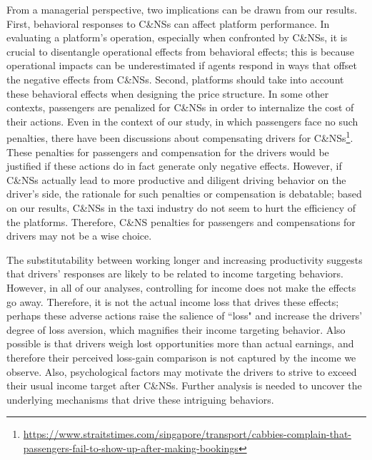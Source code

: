 \documentclass[reviewmode]{AEA}
\begin{document}
From a managerial perspective, two implications can be drawn from our results. First, behavioral responses to C\&NSs can affect platform performance. In evaluating a platform's operation, especially when confronted by C\&NSs, it is crucial to disentangle operational effects from behavioral effects; this is because operational impacts can be underestimated if agents respond in ways that offset the negative effects from C\&NSs. Second, platforms should take into account these behavioral effects when designing the price structure. In some other contexts, passengers are penalized for C\&NSs in order to internalize the cost of their actions. Even in the context of our study, in which passengers face no such penalties, there have been discussions about compensating drivers for C\&NSs\footnote{\url{https://www.straitstimes.com/singapore/transport/cabbies-complain-that-passengers-fail-to-show-up-after-making-bookings}}. These penalties for passengers and compensation for the drivers would be justified if these actions do in fact generate only negative effects. However, if C\&NSs actually lead to more productive and diligent driving behavior on the driver's side, the rationale for such penalties or compensation is debatable; based on our results, C\&NSs in the taxi industry do not seem to hurt the efficiency of the platforms. Therefore, C\&NS penalties for passengers and compensations for drivers may not be a wise choice.

The substitutability between working longer and increasing productivity suggests that drivers' responses are likely to be related to income targeting behaviors. However, in all of our analyses, controlling for income does not make the effects go away. Therefore, it is not the actual income loss that drives these effects; perhaps these adverse actions raise the salience of ``loss" and increase the drivers' degree of loss aversion, which magnifies their income targeting behavior. Also possible is that drivers weigh lost opportunities more than actual earnings, and therefore their perceived loss-gain comparison is not captured by the income we observe. Also, psychological factors may motivate the drivers to strive to exceed their usual income target after C\&NSs. Further analysis is needed to uncover the underlying mechanisms that drive these intriguing behaviors.


\end{document}
